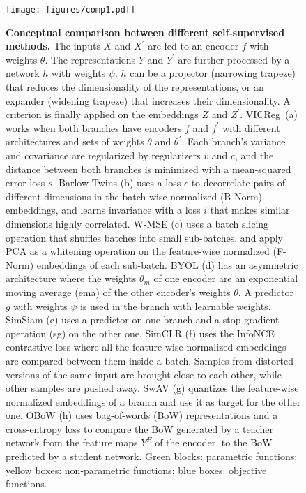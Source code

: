 \documentclass{article}
\newcommand{\algo}{VICReg}
\begin{document}
\newpage

\begin{figure}[t]
\centering
\hspace{2mm}
{\texttt{[image: figures/comp1.pdf]}}
\vspace{-10mm}
\end{figure}

\begin{figure}[t]
\centering
\captionsetup[subfigure]{labelformat=empty}
\vspace{-4mm}
\caption{\textbf{Conceptual comparison between different self-supervised methods.} The inputs $X$ and $X^{\prime}$ are fed to an encoder $f$ with weights $\theta$. The representations $Y$ and $Y^{\prime}$ are further processed by a network $h$ with weights $\psi$. $h$ can be a projector (narrowing trapeze) that reduces the dimensionality of the representations, or an expander (widening trapeze) that increases their dimensionality. A criterion is finally applied on the embeddings $Z$ and $Z^{\prime}$. \algo \ (a) works when both branches have encoders $f$ and $f^{\prime}$ with different architectures and sets of weights $\theta$ and $\theta^{\prime}$. Each branch's variance and covariance are regularized by regularizers $v$ and $c$, and the distance between both branches is minimized with a mean-squared error loss $s$. Barlow Twins (b) uses a loss $c$ to decorrelate pairs of different dimensions in the batch-wise normalized (B-Norm) embeddings, and learns invariance with a loss $i$ that makes similar dimensions highly correlated. W-MSE (c) uses a batch slicing operation that shuffles batches into small sub-batches, and apply PCA as a whitening operation on the feature-wise normalized (F-Norm) embeddings of each sub-batch. BYOL (d) has an asymmetric architecture where the weights $\theta_{m}$ of one encoder are an exponential moving average (ema) of the other encoder's weights $\theta$. A predictor $g$ with weights $\psi$ is used in the branch with learnable weights. SimSiam (e) uses a predictor on one branch and a stop-gradient operation (sg) on the other one. SimCLR (f) uses the InfoNCE contrastive loss where all the feature-wise normalized embeddings are compared between them inside a batch. Samples from distorted versions of the same input are brought close to each other, while other samples are pushed away. SwAV (g) quantizes the feature-wise normalized embeddings of a branch and use it as target for the other one. OBoW (h) uses bag-of-words (BoW) representations and a cross-entropy loss to compare the BoW generated by a teacher network from the feature maps $Y^{F}$ of the encoder, to the BoW predicted by a student network. Green blocks: parametric functions; yellow boxes: non-parametric functions; blue boxes: objective functions.}
\label{fig:vicreg_comp}
\end{figure}
\end{document}
